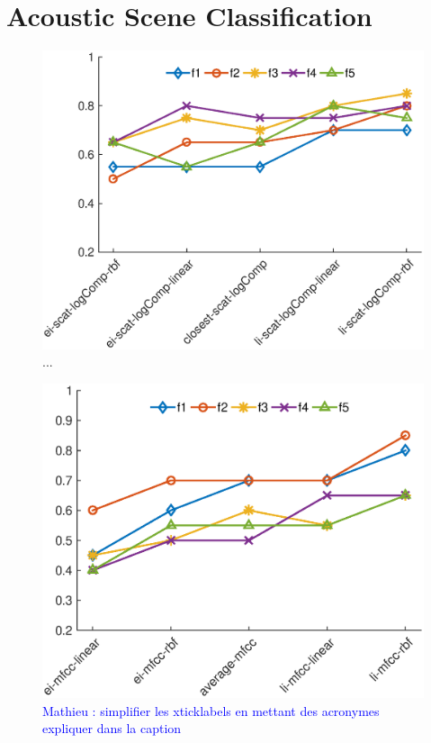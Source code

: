 \documentclass[journal]{IEEEtran}
\newcommand{\ml}[1]{\textcolor{blue}{ Mathieu : #1}}
\begin{document}
\section{Acoustic Scene Classification}


\begin{figure}
\begin{center}
\includegraphics[width=\columnwidth]{gfx/supervised_linear_test1.eps}
\caption{...}
\end{center}
\end{figure}

\begin{figure}
\begin{center}
\includegraphics[width=\columnwidth]{gfx/supervised_rbf_test2.eps}
\caption{\ml{simplifier les xticklabels en mettant des acronymes expliquer dans la caption}}
\end{center}
\end{figure}
\end{document}
